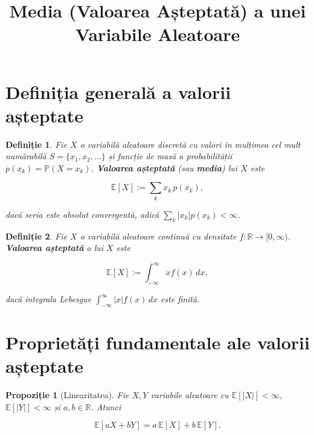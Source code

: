 \documentclass[12pt]{article}
\title{Media (Valoarea Așteptată) a unei Variabile Aleatoare}
\author{}
\date{}
\theoremstyle{plain}
\newtheorem{definition}{Definiție}
\newtheorem{proposition}{Propoziție}
\begin{document}
\maketitle

\section{Definiția generală a valorii așteptate}

\begin{definition}
Fie $X$ o variabilă aleatoare discretă cu valori în mulțimea cel mult numărabilă
$S = \{x_1, x_2, \dots\}$ și funcție de masă a probabilității $p(x_k) = \mathbb{P}(X = x_k)$.
\textbf{Valoarea așteptată} (sau \textbf{media}) lui $X$ este


\[
\mathbb{E}[X] := \sum_{k} x_k\, p(x_k),
\]


dacă seria este absolut convergentă, adică $\sum_k |x_k| p(x_k) < \infty$.
\end{definition}

\begin{definition}
Fie $X$ o variabilă aleatoare continuă cu densitate $f:\mathbb{R}\to[0,\infty)$.
\textbf{Valoarea așteptată} a lui $X$ este


\[
\mathbb{E}[X] := \int_{-\infty}^{\infty} x f(x)\, dx,
\]


dacă integrala Lebesgue $\int_{-\infty}^{\infty} |x| f(x)\, dx$ este finită.
\end{definition}

\section{Proprietăți fundamentale ale valorii așteptate}

\begin{proposition}[Linearitatea]
Fie $X,Y$ variabile aleatoare cu $\mathbb{E}[|X|]<\infty$, $\mathbb{E}[|Y|]<\infty$ și $a,b\in\mathbb{R}$.
Atunci


\[
\mathbb{E}[aX + bY] = a\,\mathbb{E}[X] + b\,\mathbb{E}[Y].
\]


\end{proposition}
\end{document}

